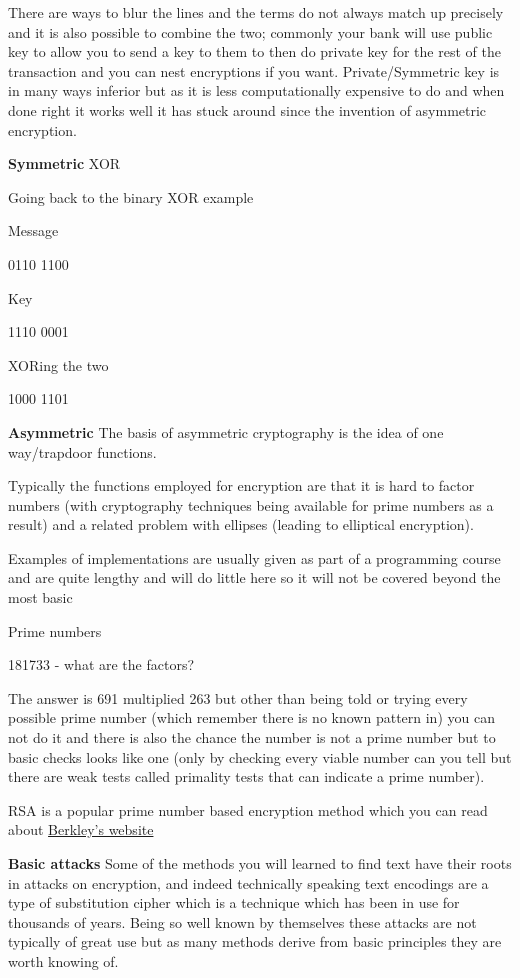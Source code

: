 \documentclass[
]{book}
\begin{document}
There are ways to blur the lines and the terms do not always match up precisely and it is also possible to combine the two; commonly your bank will use public key to allow you to send a key to them to then do private key for the rest of the transaction and you can nest encryptions if you want. Private/Symmetric key is in many ways inferior but as it is less computationally expensive to do and when done right it works well it has stuck around since the invention of asymmetric encryption.

\textbf{Symmetric} XOR

Going back to the binary XOR example

Message

0110 1100

Key

1110 0001

XORing the two

1000 1101

\textbf{Asymmetric} The basis of asymmetric cryptography is the idea of one way/trapdoor functions.

Typically the functions employed for encryption are that it is hard to factor numbers (with cryptography techniques being available for prime numbers as a result) and a related problem with ellipses (leading to elliptical encryption).

Examples of implementations are usually given as part of a programming course and are quite lengthy and will do little here so it will not be covered beyond the most basic

Prime numbers

181733 - what are the factors?

The answer is 691 multiplied 263 but other than being told or trying every possible prime number (which remember there is no known pattern in) you can not do it and there is also the chance the number is not a prime number but to basic checks looks like one (only by checking every viable number can you tell but there are weak tests called primality tests that can indicate a prime number).

RSA is a popular prime number based encryption method which you can read about \href{http://mathcircle.berkeley.edu/BMC3/rsa/node4.html}{Berkley's website}

\textbf{Basic attacks} Some of the methods you will learned to find text have their roots in attacks on encryption, and indeed technically speaking text encodings are a type of substitution cipher which is a technique which has been in use for thousands of years. Being so well known by themselves these attacks are not typically of great use but as many methods derive from basic principles they are worth knowing of.
\end{document}
